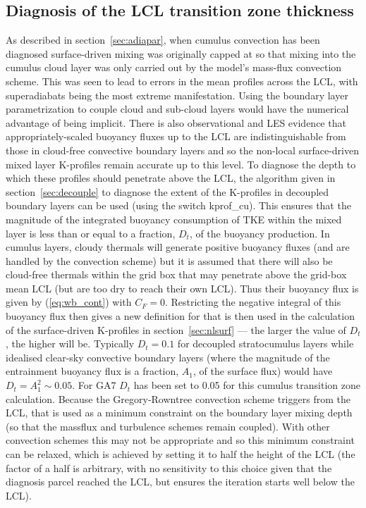 \documentclass{UMDP_article}
\begin{document}
\subsection{Diagnosis of the LCL transition zone thickness}
\label{sec:lclmixing}

As described in section~\ref{sec:adiapar}, when cumulus convection has
been diagnosed surface-driven mixing was originally capped at \zlcl so
that mixing into the cumulus cloud layer was only carried out by the
model's mass-flux convection scheme.  This was seen to lead to errors
in the mean profiles across the LCL, with superadiabats being the most
extreme manifestation.  Using the boundary layer parametrization to
couple cloud and sub-cloud layers would have the numerical advantage
of being implicit.  There is also observational and LES evidence that
appropriately-scaled buoyancy fluxes up to the LCL are
indistinguishable from those in cloud-free convective boundary layers
and so the non-local surface-driven mixed layer K-profiles remain
accurate up to this level.  To diagnose the depth to which these
profiles should penetrate above the LCL, the algorithm given in
section~\ref{sec:decouple} to diagnose the extent of the K-profiles in
decoupled boundary layers can be used (using the switch kprof\_cu).
This ensures that the magnitude of the integrated buoyancy consumption
of TKE within the mixed layer is less than or equal to a fraction, $D_t$,
of the buoyancy production.  In cumulus layers, cloudy thermals will
generate positive buoyancy fluxes (and are handled by the convection
scheme) but it is assumed that there will also be cloud-free thermals
within the grid box that may penetrate above the grid-box mean LCL
(but are too dry to reach their own LCL).  Thus their buoyancy flux is
given by (\ref{eq:wb_cont}) with $C_F=0$.  Restricting the negative
integral of this buoyancy flux then gives a new definition for \zh
that is then used in the calculation of the surface-driven K-profiles
in section~\ref{sec:nlsurf} --- the larger the value of $D_t$, the 
higher \zh will be.  Typically $D_t=0.1$ for decoupled stratocumulus 
layers while idealised clear-sky convective boundary layers (where 
the magnitude of the entrainment buoyancy flux is a fraction, $A_1$, 
of the surface flux) would have $D_t = A_1^2 \sim 0.05$.  For GA7 $D_t$ 
has been set to 0.05 for this cumulus transition zone calculation.  
Because the Gregory-Rowntree convection scheme triggers from the LCL, that 
is used as a minimum constraint on the boundary layer mixing depth (so that 
the massflux and turbulence schemes remain coupled).  With other convection
schemes this may not be appropriate and so this minimum constraint can be 
relaxed, which is achieved by setting it to half the height of the LCL (the 
factor of a half is arbitrary, with no sensitivity to this choice given that 
the diagnosis parcel reached the LCL, but ensures the iteration starts well 
below the LCL).
\end{document}
